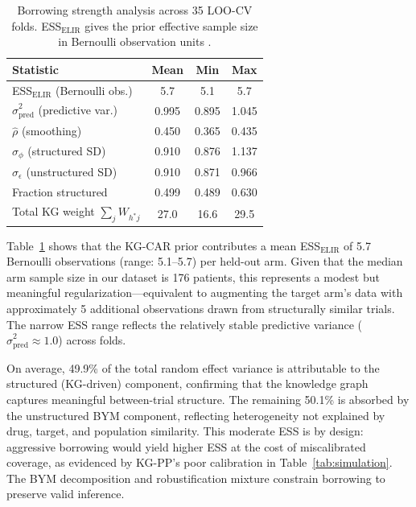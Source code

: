 \documentclass[12pt]{article}
\begin{document}
\begin{table}[ht]
\centering
\caption{Borrowing strength analysis across 35 LOO-CV folds. ESS$_{\text{ELIR}}$ gives the prior effective sample size in Bernoulli observation units \citep{neuenschwander2020predictively}.}
\label{tab:ess}
\begin{tabular}{lccc}
\toprule
Statistic & Mean & Min & Max \\
\midrule
ESS$_{\text{ELIR}}$ (Bernoulli obs.) & 5.7 & 5.1 & 5.7 \\
$\hat{\sigma}^2_{\text{pred}}$ (predictive var.) & 0.995 & 0.895 & 1.045 \\
$\hat{\rho}$ (smoothing) & 0.450 & 0.365 & 0.435 \\
$\hat{\sigma}_\phi$ (structured SD) & 0.910 & 0.876 & 1.137 \\
$\hat{\sigma}_\epsilon$ (unstructured SD) & 0.910 & 0.871 & 0.966 \\
Fraction structured & 0.499 & 0.489 & 0.630 \\
Total KG weight $\sum_j W_{h^*j}$ & 27.0 & 16.6 & 29.5 \\
\bottomrule
\end{tabular}
\end{table}

Table~\ref{tab:ess} shows that the KG-CAR prior contributes a mean ESS$_{\text{ELIR}}$ of 5.7 Bernoulli observations (range: 5.1--5.7) per held-out arm. Given that the median arm sample size in our dataset is 176 patients, this represents a modest but meaningful regularization---equivalent to augmenting the target arm's data with approximately 5 additional observations drawn from structurally similar trials. The narrow ESS range reflects the relatively stable predictive variance ($\hat\sigma^2_{\text{pred}} \approx 1.0$) across folds.

On average, 49.9\% of the total random effect variance is attributable to the structured (KG-driven) component, confirming that the knowledge graph captures meaningful between-trial structure. The remaining 50.1\% is absorbed by the unstructured BYM component, reflecting heterogeneity not explained by drug, target, and population similarity. This moderate ESS is by design: aggressive borrowing would yield higher ESS at the cost of miscalibrated coverage, as evidenced by KG-PP's poor calibration in Table~\ref{tab:simulation}. The BYM decomposition and robustification mixture constrain borrowing to preserve valid inference.
\end{document}
